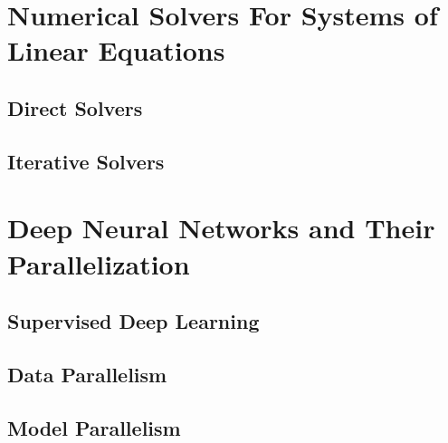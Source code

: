 \section{Numerical Solvers For Systems of Linear Equations}
\label{sec:solvers}

\subsection{Direct Solvers}
\subsection{Iterative Solvers}

\section{Deep Neural Networks and Their Parallelization}
\label{sec:dnn}
\subsection{Supervised Deep Learning}
\subsection{Data Parallelism}
\subsection{Model Parallelism}
